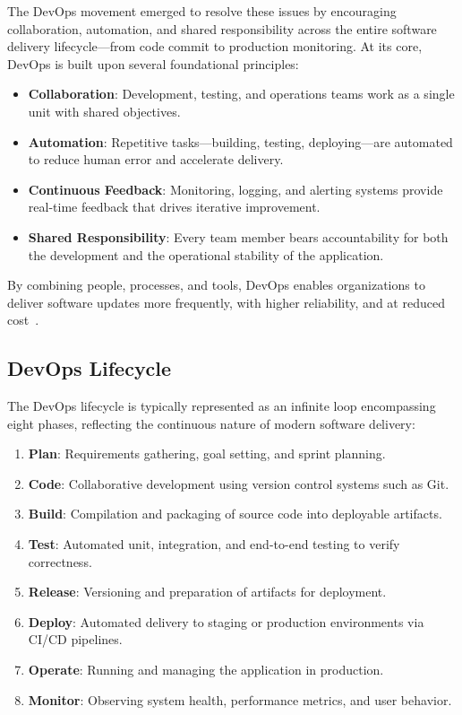 The DevOps movement emerged to resolve these issues by encouraging collaboration, automation, and shared responsibility across the entire software delivery lifecycle—from code commit to production monitoring. At its core, DevOps is built upon several foundational principles:

\begin{itemize}
    \item \textbf{Collaboration}: Development, testing, and operations teams work as a single unit with shared objectives.
    \item \textbf{Automation}: Repetitive tasks—building, testing, deploying—are automated to reduce human error and accelerate delivery.
    \item \textbf{Continuous Feedback}: Monitoring, logging, and alerting systems provide real-time feedback that drives iterative improvement.
    \item \textbf{Shared Responsibility}: Every team member bears accountability for both the development and the operational stability of the application.
\end{itemize}

By combining people, processes, and tools, DevOps enables organizations to deliver software updates more frequently, with higher reliability, and at reduced cost~\cite{devopshandbook}.

\subsection{DevOps Lifecycle}

The DevOps lifecycle is typically represented as an infinite loop encompassing eight phases, reflecting the continuous nature of modern software delivery:

\begin{enumerate}
    \item \textbf{Plan}: Requirements gathering, goal setting, and sprint planning.
    \item \textbf{Code}: Collaborative development using version control systems such as Git.
    \item \textbf{Build}: Compilation and packaging of source code into deployable artifacts.
    \item \textbf{Test}: Automated unit, integration, and end-to-end testing to verify correctness.
    \item \textbf{Release}: Versioning and preparation of artifacts for deployment.
    \item \textbf{Deploy}: Automated delivery to staging or production environments via CI/CD pipelines.
    \item \textbf{Operate}: Running and managing the application in production.
    \item \textbf{Monitor}: Observing system health, performance metrics, and user behavior.
\end{enumerate}


